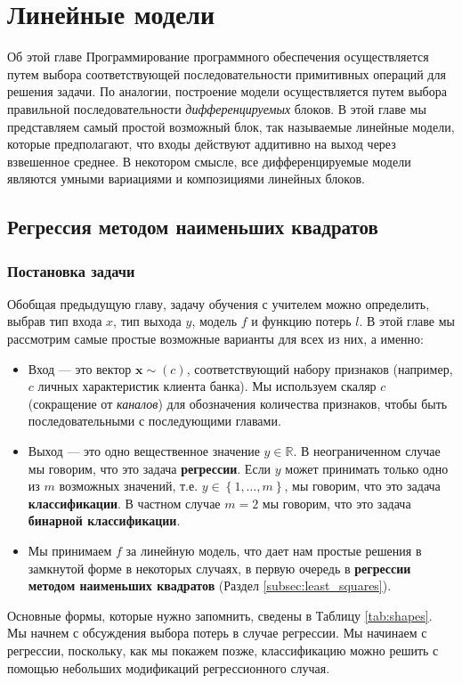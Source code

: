 \chapter{Линейные модели}
\label{chap:linear_models}

\begin{supportbox}{Об этой главе}
Программирование программного обеспечения осуществляется путем выбора соответствующей последовательности примитивных операций для решения задачи. По аналогии, построение модели осуществляется путем выбора правильной последовательности \textit{дифференцируемых} блоков. В этой главе мы представляем самый простой возможный блок, так называемые линейные модели, которые предполагают, что входы действуют аддитивно на выход через взвешенное среднее. В некотором смысле, все дифференцируемые модели являются умными вариациями и композициями линейных блоков.
\end{supportbox}

\section{Регрессия методом наименьших квадратов}

\subsection{Постановка задачи}

Обобщая предыдущую главу, задачу обучения с учителем можно определить, выбрав тип входа $x$, тип выхода $y$, модель $f$ и функцию потерь $l$. В этой главе мы рассмотрим самые простые возможные варианты для всех из них, а именно:
%
\begin{itemize}
    \item Вход — это вектор $\mathbf{x} \sim (c)$, соответствующий набору признаков (например, $c$ личных характеристик клиента банка). Мы используем скаляр $c$ (сокращение от \textit{каналов}) для обозначения количества признаков, чтобы быть последовательными с последующими главами.
    \item Выход — это одно вещественное значение $y \in \mathbb{R}$. В неограниченном случае мы говорим, что это задача \textbf{регрессии}. Если $y$ может принимать только одно из $m$ возможных значений, т.е. $y \in \left\{1, \ldots, m\right\}$, мы говорим, что это задача \textbf{классификации}. В частном случае $m=2$ мы говорим, что это задача \textbf{бинарной классификации}.
    \item Мы принимаем $f$ за линейную модель, что дает нам простые решения в замкнутой форме в некоторых случаях, в первую очередь в \textbf{регрессии методом наименьших квадратов} (Раздел \ref{subsec:least_squares}).
\end{itemize}
%
Основные формы, которые нужно запомнить, сведены в Таблицу \ref{tab:shapes}. Мы начнем с обсуждения выбора потерь в случае регрессии. Мы начинаем с регрессии, поскольку, как мы покажем позже, классификацию можно решить с помощью небольших модификаций регрессионного случая.

